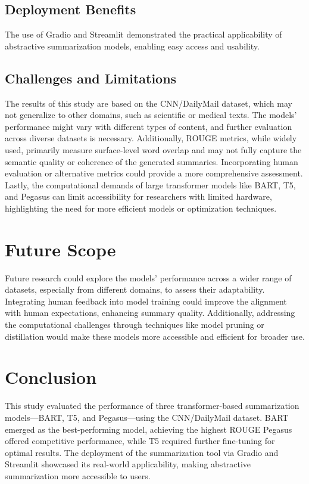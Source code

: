 \documentclass[a4paper,12pt]{article}
\begin{document}
\subsection{Deployment Benefits}
The use of Gradio and Streamlit demonstrated the practical applicability of abstractive summarization models, enabling easy access and usability.

\subsection{Challenges and Limitations}

    The results of this study are based on the CNN/DailyMail dataset, which may not generalize to other domains, such as scientific or medical texts. The models' performance might vary with different types of content, and further evaluation across diverse datasets is necessary. Additionally, ROUGE metrics, while widely used, primarily measure surface-level word overlap and may not fully capture the semantic quality or coherence of the generated summaries. Incorporating human evaluation or alternative metrics could provide a more comprehensive assessment. Lastly, the computational demands of large transformer models like BART, T5, and Pegasus can limit accessibility for researchers with limited hardware, highlighting the need for more efficient models or optimization techniques.
\section{Future Scope}
Future research could explore the models' performance across a wider range of datasets, especially from different domains, to assess their adaptability. Integrating human feedback into model training could improve the alignment with human expectations, enhancing summary quality. Additionally, addressing the computational challenges through techniques like model pruning or distillation would make these models more accessible and efficient for broader use.


\section{Conclusion}
This study evaluated the performance of three transformer-based summarization models—BART, T5, and Pegasus—using the CNN/DailyMail dataset. BART emerged as the best-performing model, achieving the highest ROUGE Pegasus offered competitive performance, while T5 required further fine-tuning for optimal results. The deployment of the summarization tool via Gradio and Streamlit showcased its real-world applicability, making abstractive summarization more accessible to users.
\end{document}
